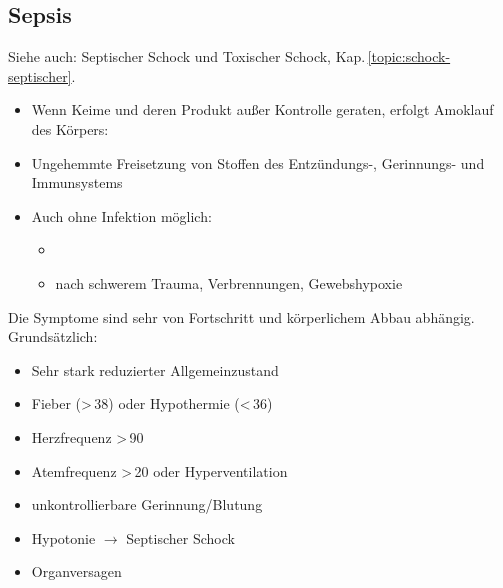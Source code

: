 



\subsection{Sepsis}
\label{topic:sepsis}

Siehe auch: Septischer Schock und Toxischer Schock,
Kap.\,\ref{topic:schock-septischer}.

\begin{itemize}
  \item Wenn Keime und deren Produkt außer Kontrolle geraten,
  erfolgt Amoklauf des Körpers:
  \item Ungehemmte Freisetzung von Stoffen des Entzündungs-, Gerinnungs-
  und Immunsystems
  \item Auch ohne Infektion möglich:
  \begin{itemize}
    \item {}
    \item nach schwerem Trauma, Verbrennungen, Gewebshypoxie
  \end{itemize}
\end{itemize}


{%
Die Symptome sind sehr von Fortschritt und
körperlichem Abbau abhängig. Grundsätzlich:


\begin{itemize}
  \item Sehr stark reduzierter Allgemeinzustand
  \item Fieber ({\textgreater}\,38{\DegC}) oder
  Hypothermie ({\textless}\,36{\DegC})
  \item Herzfrequenz {\textgreater}\,90\nicefrac{}{\Min}
  \item Atemfrequenz {\textgreater}\,20\nicefrac{}{\Min} oder
  Hyperventilation
  \item unkontrollierbare Gerinnung/Blutung
  \item Hypotonie ${\rightarrow}$ Septischer Schock
  \item Organversagen
\end{itemize}

}{}{}{}{}


\ChapterEnd